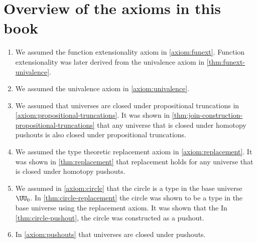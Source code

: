 \chapter{Overview of the axioms in this book}

\begin{enumerate}
\item We assumed the function extensionality axiom in \cref{axiom:funext}. Function extensionality was later derived from the univalence axiom in \cref{thm:funext-univalence}.
\item We assumed the univalence axiom in \cref{axiom:univalence}.
\item We assumed that universes are closed under propositional truncations in \cref{axiom:propositional-truncations}. It was shown in \cref{thm:join-construction-propositional-truncations} that any universe that is closed under homotopy pushouts is also closed under propositional truncations.
\item We assumed the type theoretic replacement axiom in \cref{axiom:replacement}. It was shown in \cref{thm:replacement} that replacement holds for any universe that is closed under homotopy pushouts.
\item We assumed in \cref{axiom:circle} that the circle is a type in the base universe $\UU_0$. In \cref{thm:circle-replacement} the circle was shown to be a type in the base universe using the replacement axiom. It was shown that the In \cref{thm:circle-pushout}, the circle was constructed as a pushout.
\item In \cref{axiom:pushouts} that universes are closed under pushouts.
\end{enumerate}